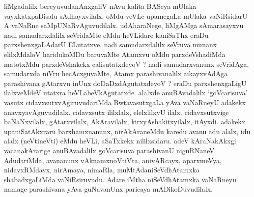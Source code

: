 \begin{entry}
{{liMgadalilx bereyuvudanAnxgaliV nAvu kalita BASeya mUlaka
vayxkatxpaDisalu sAdhayxvilalx. oMdu veVLe upamegaLa mUlaka
vaNiRsidarU A vaNaRne saMpUNaRvAguvudilalx. udAharaNege, liMgAMga
sAmarasayxvu nadi samudarxdalilx seVridaMte eMdu heVLidare kaniSaThx
eraDu parxshenxgaLAdarU ELutatxve. nadi samudarxdalilx seVruva munanx
elilxMdaloV haridukoMDu baruvaMte Atamxvu oMdu parxdeVshadiMda
matotxMdu parxdeVshakekx calisutatxdeyoV ? nadi samudarxvanunx
seVridAga, samudarxda niVru hecAcxguvaMte, Atamx parashivanalilx
aikayxvAdAga parashivana gAtarxvu inUnx doDaDxdAgutatxdeyoV ? eraDu
parxshenxgaLigU ilalxveMdeV utatxra heVLabeVkAgutatxde. alalxde
anuBAvadalilx `goVcarisuva' vasutx cidavxsutxvAgiruvudariMda BwtavasutxgaLa yAva vaNaRneyU adakekx anavxyavAguvudilalx. cidavxsutx
ililxlalx, elelxlilxyU ilalx. cidavxsutxvige baNaNxvilalx,
gAtarxvilalx, AkAravilalx, kirxyAshakitxyilalx, itAyxdi. adakekx
upaniSatAkxraru barxhamxnanunx, nirAkAraneMdu karedu avanu adu alalx,
idu alalx (neVtineVti) eMdu heVLi, aSaTxkekx nililxsidaru. adeV
kAraNakAkxgi vacanakArarige anuBAvadalilx goVcarisuva parashivanU\break
niguRNaneV AdudariMda, avananunx vAknamxnoVtiVta, anivARcayx,
aparxmeVya, nidavxRMdavx, nirAmaya, nimaRla, muMtAda\break niSeVdhAtamxka
shabadxgaLiMda vaNiRsiruvudu. Adare iMtha niSeV\-dhAtamxka vaNaRneyu
namage parashivana yAva guNavanUnx pari\-caya mADikoDuvudilalx.}}
\end{entry}
